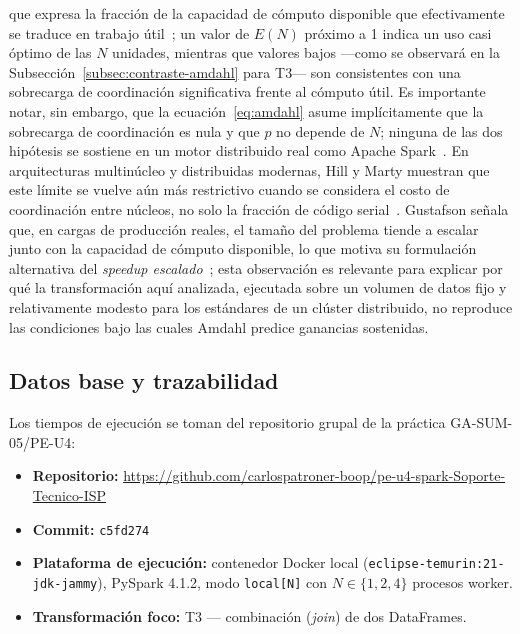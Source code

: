 \documentclass[11pt,a4paper]{article}
\begin{document}
    que expresa la fracción de la capacidad de cómputo disponible que
    efectivamente se traduce en trabajo útil~\cite{grama2003}; un valor de
    $E(N)$ próximo a 1 indica un uso casi óptimo de las $N$ unidades,
    mientras que valores bajos —como se observará en la
    Subsección~\ref{subsec:contraste-amdahl} para T3— son consistentes con
    una sobrecarga de coordinación significativa frente al cómputo útil.
    Es importante notar, sin embargo, que la
    ecuación~\eqref{eq:amdahl} asume implícitamente que la sobrecarga de
    coordinación es nula y que $p$ no depende de $N$; ninguna de las dos
    hipótesis se sostiene en un motor distribuido real como Apache
    Spark~\cite{gustafson1988}. En arquitecturas multinúcleo y
    distribuidas modernas, Hill y Marty muestran que este límite se
    vuelve aún más restrictivo cuando se considera el costo de
    coordinación entre núcleos, no solo la fracción de código
    serial~\cite{hillmarty2008}. Gustafson señala que, en cargas de
    producción reales, el tamaño del problema tiende a escalar junto con
    la capacidad de cómputo disponible, lo que motiva su formulación
    alternativa del \emph{speedup escalado}~\cite{gustafson1988}; esta
    observación es relevante para explicar por qué la transformación aquí
    analizada, ejecutada sobre un volumen de datos fijo y relativamente
    modesto para los estándares de un clúster distribuido, no reproduce
    las condiciones bajo las cuales Amdahl predice ganancias sostenidas.

    \subsection{Datos base y trazabilidad}

    Los tiempos de ejecución se toman del repositorio grupal de la
    práctica GA-SUM-05/PE-U4:

    \begin{itemize}
        \item \textbf{Repositorio:} \url{https://github.com/carlospatroner-boop/pe-u4-spark-Soporte-Tecnico-ISP}
        \item \textbf{Commit:} \texttt{c5fd274}
        \item \textbf{Plataforma de ejecución:} contenedor Docker local
        (\texttt{eclipse-temurin:21-jdk-jammy}), PySpark 4.1.2, modo
        \texttt{local[N]} con $N \in \{1,2,4\}$ procesos worker.
        \item \textbf{Transformación foco:} T3 — combinación (\emph{join})
        de dos DataFrames.
    \end{itemize}
\end{document}
